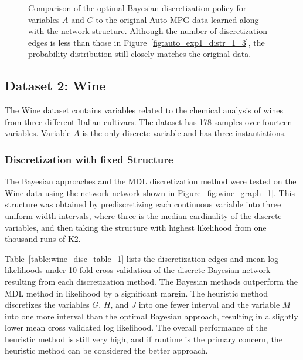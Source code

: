 \begin{figure}[ht]
  \centering
  
  \caption{
    Comparison of the optimal Bayesian discretization policy for variables $A$ and $C$ to the original Auto MPG data learned along with the network structure.
    Although the number of discretization edges is less than those in Figure~\ref{fig:auto_exp1_distr_1_3}, the probability distribution still closely matches the original data.
  }
  \label{fig:auto_exp2_distr_1_3}
\end{figure}

%
%

\subsection{Dataset 2: Wine}
\label{subsec:wine}

The Wine dataset contains variables related to the chemical analysis of wines from three different Italian cultivars.
The dataset has \num{178} samples over fourteen variables.
Variable $A$ is the only discrete variable and has three instantiations.

\subsubsection{Discretization with fixed Structure}
\label{subsubsec:wine_exp1}

The Bayesian approaches and the MDL discretization method were tested on the Wine data using the network network shown in Figure~\ref{fig:wine_graph_1}.
This structure was obtained by prediscretizing each continuous variable into three uniform-width intervals, where three is the median cardinality of the discrete variables, and then taking the structure with highest likelihood from one thousand runs of K2.

Table~\ref{table:wine_disc_table_1} lists the discretization edges and mean log-likelihoods under 10-fold cross validation of the discrete Bayesian network resulting from each discretization method.
The Bayesian methods outperform the MDL method in likelihood by a significant margin.
The heuristic method discretizes the variables $G$, $H$, and $J$ into one fewer interval and the variable $M$ into one more interval than the optimal Bayesian approach, resulting in a slightly lower mean cross validated log likelihood.
The overall performance of the heuristic method is still very high, and if runtime is the primary concern, the heuristic method can be considered the better approach.

